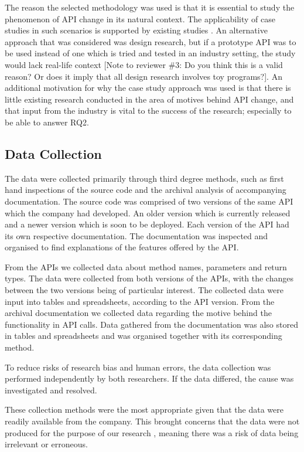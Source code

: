 \documentclass[10pt,twocolumn]{article}
\begin{document}
The reason the selected methodology was used is that it is essential to study the phenomenon of API change in its natural context. The applicability of case studies in such scenarios is supported by existing studies \cite{runeson2009guidelines} \cite{benbasat1987case} \cite{yin2013case} \cite{robson2002real}. An alternative approach that was considered was design research, but if a prototype API was to be used instead of one which is tried and tested in an industry setting, the study would lack real-life context \cite{runeson2009guidelines} [Note to reviewer \#3: Do you think this is a valid reason? Or does it imply that all design research involves toy programs?]. An additional motivation for why the case study approach was used is that there is little existing research conducted in the area of motives behind API change, and that input from the industry is vital to the success of the research; especially to be able to answer RQ2. 

\subsection{Data Collection}
The data were collected primarily through third degree methods, such as first hand inspections of the source code and the archival analysis of accompanying  documentation. The source code was comprised of two versions of the same API which the company had developed. An older version which is currently released and a newer version which is soon to be deployed. Each version of the API had its own respective documentation. The documentation was inspected and organised to find explanations of the features offered by the API.

From the APIs we collected data about method names, parameters and return types. The data were collected from both versions of the APIs, with the changes between the two versions being of particular interest. The collected data were input into tables and spreadsheets, according to the API version. From the archival documentation we collected data regarding the motive behind the functionality in API calls. Data gathered from the documentation was also stored in tables and spreadsheets and was organised together with its corresponding method.

To reduce risks of research bias and human errors, the data collection was performed independently by both researchers. If the data differed, the cause was investigated and resolved. 

These collection methods were the most appropriate given that the data were readily available from the company. This brought concerns that the data were not produced for the purpose of our research \cite{runeson2009guidelines}, meaning there was a risk of data being irrelevant or erroneous. 
\end{document}
